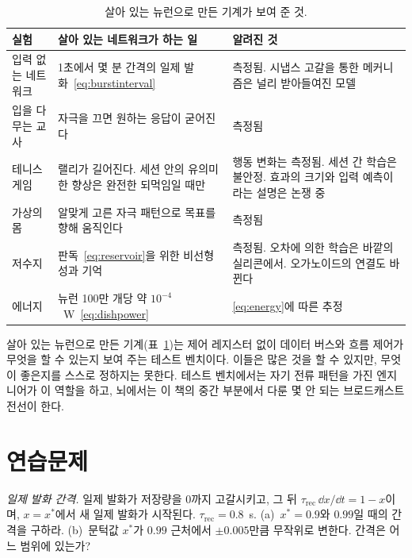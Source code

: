 \begin{table}[t]
\centering
\footnotesize
\setlength{\tabcolsep}{4pt}
\renewcommand{\arraystretch}{1.15}
\begin{tabular}{>{\raggedright}p{2.8cm}>{\raggedright}p{4.2cm}>{\raggedright\arraybackslash}p{5.8cm}}
\toprule
실험 & 살아 있는 네트워크가 하는 일 & 알려진 것 \\
\midrule
입력 없는 네트워크 & 1초에서 몇 분 간격의 일제 발화~\eqref{eq:burstinterval} & 측정됨. 시냅스 고갈을 통한 메커니즘은 널리 받아들여진 모델 \\
입을 다무는 교사 & 자극을 끄면 원하는 응답이 굳어진다 & 측정됨 \\
테니스 게임 & 랠리가 길어진다. 세션 안의 유의미한 향상은 완전한 되먹임일 때만 & 행동 변화는 측정됨. 세션 간 학습은 불안정. 효과의 크기와 입력 예측이라는 설명은 논쟁 중 \\
가상의 몸 & 알맞게 고른 자극 패턴으로 목표를 향해 움직인다 & 측정됨 \\
저수지 & 판독~\eqref{eq:reservoir}을 위한 비선형성과 기억 & 측정됨. 오차에 의한 학습은 바깥의 실리콘에서. 오가노이드의 연결도 바뀐다 \\
에너지 & 뉴런 100만 개당 약 $10^{-4}$~W~\eqref{eq:dishpower} & \eqref{eq:energy}에 따른 추정 \\
\bottomrule
\end{tabular}
\caption{살아 있는 뉴런으로 만든 기계가 보여 준 것.}
\label{tab:livingmachine}
\end{table}

살아 있는 뉴런으로 만든 기계(표~\ref{tab:livingmachine})는 제어 레지스터 없이 데이터 버스와 흐름 제어가 무엇을 할 수 있는지 보여 주는 테스트 벤치이다. 이들은 많은 것을 할 수 있지만, 무엇이 좋은지를 스스로 정하지는 못한다. 테스트 벤치에서는 자기 전류 패턴을 가진 엔지니어가 이 역할을 하고, 뇌에서는 이 책의 중간 부분에서 다룬 몇 안 되는 브로드캐스트 전선이 한다.

\section{연습문제}

\begin{exercise}[\lvlA]
\label{ex:21:1}
\emph{일제 발화 간격.} 일제 발화가 저장량을 0까지 고갈시키고, 그 뒤 $\tau_{\text{rec}}\,\dd x/\dd t=1-x$이며, $x=x^*$에서 새 일제 발화가 시작된다. $\tau_{\text{rec}}=0.8$~s. (a)~$x^*=0.9$와 $0.99$일 때의 간격을 구하라. (b)~문턱값 $x^*$가 $0.99$ 근처에서 $\pm0.005$만큼 무작위로 변한다. 간격은 어느 범위에 있는가?
\end{exercise}

